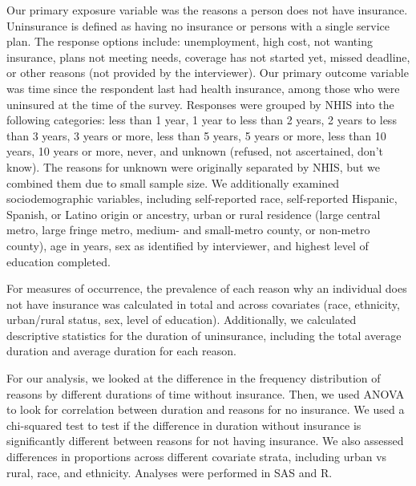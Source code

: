 \documentclass[12pt]{article}
\begin{document}
Our primary exposure variable was the reasons a person does not have insurance. Uninsurance is defined as having no insurance or persons with a single service plan. The response options include: unemployment, high cost, not wanting insurance, plans not meeting needs, coverage has not started yet, missed deadline, or other reasons (not provided by the interviewer). Our primary outcome variable was time since the respondent last had health insurance, among those who were uninsured at the time of the survey. Responses were grouped by NHIS into the following categories: less than 1 year, 1 year to less than 2 years, 2 years to less than 3 years, 3 years or more, less than 5 years, 5 years or more, less than 10 years, 10 years or more, never, and unknown (refused, not ascertained, don’t know). The reasons for unknown were originally separated by NHIS, but we combined them due to small sample size. We additionally examined sociodemographic variables, including self-reported race, self-reported Hispanic, Spanish, or Latino origin or ancestry, urban or rural residence (large central metro, large fringe metro, medium- and small-metro county, or non-metro county), age in years, sex as identified by interviewer, and highest level of education completed.

For measures of occurrence, the prevalence of each reason why an individual does not have insurance was calculated in total and across covariates (race, ethnicity, urban/rural status, sex, level of education). Additionally, we calculated descriptive statistics for the duration of uninsurance, including the total average duration and average duration for each reason. 

For our analysis, we looked at the difference in the frequency distribution of reasons by different durations of time without insurance. Then, we used ANOVA to look for correlation between duration and reasons for no insurance. We used a chi-squared test to test if the difference in duration without insurance is significantly different between reasons for not having insurance. We also assessed differences in proportions across different covariate strata, including urban vs rural, race, and ethnicity. Analyses were performed in SAS and R.
\end{document}
